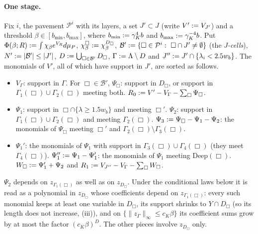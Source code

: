 
\paragraph{One stage.} Fix $i$, the pavement $\mathcal P^i$ with its layers, a set $J'\subset J$ (write $V':= V_{J'}$) and a threshold $\beta\in[b_{\min},b_{\max}]$, where $b_{\min}:=\gamma_K^4b$ and $b_{\max}:=\gamma_K^{-4}b$. Put $\Phi(\beta;R):=\int\chi_\beta e^{V_R}d\mu_P$, $\chi^\Box_\beta:=\chi^{D_\Box}_\beta$, $\mathcal B'\defeq\{\Box\in\mathcal P^i:\ \Box\cap J'\ne\emptyset\}$ (the \emph{$J$-cells}), $N':=|\mathcal B'|\le|J'|$, $D:=\bigcup_{\Box\in\mathcal B'}D_\Box$, $\Gamma:=\Lambda\setminus D$ and $J'':= J'\cap\{\lambda_i<2.5w_b\}$. The monomials of $V'$, all of which have support in $J'$, are sorted as follows.
\begin{itemize}[leftmargin=*]
\item $V_\Gamma$: support in $\Gamma$. For $\Box\in\mathcal B'$, $\Psi_\Box$: support in $D_\Box$, or support in $\Gamma_1(\Box)\cup\Gamma_2(\Box)$ meeting both. $R_0:= V'-V_\Gamma-\sum_\Box\Psi_\Box$.
\item $\Psi_1$: support in $\Box\cap\{\lambda\ge1.5w_b\}$ and meeting $\Box'$. $\Psi_2$: support in $\Gamma_1(\Box)\cup\Gamma_2(\Box)$ and meeting $\Gamma_2(\Box)$. $\Psi_3:=\Psi_\Box-\Psi_1-\Psi_2$: the monomials of $\Psi_\Box$ meeting $\Box'$ and $\Gamma_2(\Box)\setminus\Gamma_3(\Box)$.
\item $\Psi_1'$: the monomials of $\Psi_1$ with support in $\Gamma_3(\Box)\cup\Gamma_4(\Box)$ (they meet $\Gamma_4(\Box)$). $\Psi_1'':=\Psi_1-\Psi_1'$: the monomials of $\Psi_1$ meeting $\mathrm{Deep}(\Box)$. $W_\Box:=\Psi_1'+\Psi_2$ and $R_1:= V_{J''}-V_\Gamma-\sum_\Box W_\Box$.
\end{itemize}
$\Psi_2$ depends on $z_{\Gamma_1(\Box)}$ as well as on $z_{D_\Box}$. Under the conditional laws below it is read as a polynomial in $z_{D_\Box}$ whose coefficients depend on $z_{\Gamma_1(\Box)}$: every such monomial keeps at least one variable in $D_\Box$, its support shrinks to $Y\cap D_\Box$ (so its length does not increase, (iii)), and on $\{\|z_\Gamma\|_\infty\le c_K\beta\}$ its coefficient sums grow by at most the factor $(c_K\beta)^D$. The other pieces involve $z_{D_\Box}$ only.


